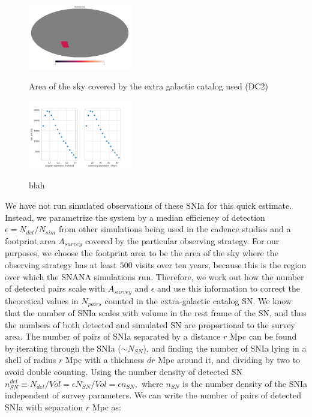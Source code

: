 \begin{figure}
    \begin{center}
        {\includegraphics[width=0.4\textwidth]{figures/catalog_area}}
        \caption{Area of the sky covered by the extra galactic catalog used (DC2)}
    \end{center}
    \label{fig:catalog_area}
\end{figure}


\begin{figure}
    \begin{center}
        {\includegraphics[width=0.4\textwidth]{figures/NumberPairsatDistance_z0p05}}
        \caption{blah}
    \end{center}
    \label{fig:num_pairs_cat}
\end{figure}
We have not run simulated observations of these SNIa for this quick estimate. Instead, we parametrize the system by a median efficiency of detection $\epsilon = N_{det} / N_{sim} $ from other simulations being used in the cadence studies and a footprint area $A_{survey}$ covered by the particular observing strategy. For our purposes, we choose the footprint area to be the area of the sky where the observing strategy has at least $500$ visits over ten years, because this is the region over which the SNANA simulations run.
Therefore, we work out how the number of detected pairs scale with $A_{survey}$ and $\epsilon$ and use this information to correct the theoretical values in $N_{pairs}$ counted in the extra-galactic catalog SN. We know that the number of SNIa scales with volume in the rest frame of the SN, and thus the numbers of both detected and simulated SN are proportional to the survey area. The number of pairs of SNIa separated by a distance $r$ Mpc can be found by iterating through the SNIa ($\sim N_{SN}$), and finding the number of SNIa lying in a shell of radius $r$ Mpc with a thichness $dr$ Mpc around it, and dividing by two to avoid double counting. Using the number density of detected SN $n^{det}_{SN} \equiv N_{det}/Vol = \epsilon N_{SN}/Vol = \epsilon n_{SN},$ where $n_{SN}$ is the number density of the SNIa independent of survey parameters. We can write the number of pairs of detected SNIa with separation $r$ Mpc as:

